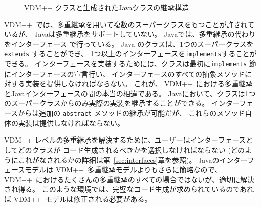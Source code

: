 \documentclass[\pformat,11pt]{jarticle}
\newcommand{\VDM}{VDM++}
\begin{document}
\begin{figure}[H]
\begin{center}
\quad
{}
\end{center}
\caption{VDM++ クラスと生成されたJavaクラスの継承構造}\label{fig:sortppjava}

\end{figure}

\VDM\ では、多重継承を用いて複数のスーパークラスをもつことが許されているが、
Javaは多重継承をサポートしていない。
Javaでは、多重継承の代わりをインターフェース \cite{Gosling&00}で行っている。
Java のクラスは、1つのスーパークラスを{\tt extends} することができ、
1つ以上のインターフェースを{\tt implements}することができる。
インターフェースを実装するためには、クラスは最初に{\tt implements} 節にインターフェースの宣言行い、
インターフェースのすべての抽象メソッドに対する実装を提供しなければならない。
これが、 \VDM\ における多重継承とJavaインターフェースの間の本当の相違である。
Javaにおいて、クラスは1つのスーパークラスからのみ実際の実装を継承することができる。
インターフェースからは追加の {\tt abstract} メソッドの継承が可能だが、
これらのメソッド自体の実装は提供しなければならない。

 VDM++ レベルの多重継承を解決するために、ユーザーはインターフェースとしてどのクラスが
コード生成されるべきかを選択しなければならない (どのようにこれがなされるかの詳細は第~\ref{sec:interfaces}章を参照)。
Javaのインターフェースモデルは \VDM\ 多重継承モデルよりもさらに簡略なので、
\VDM\ におけるたくさんの多重継承のすべての場合ではないが、適切に解決され得る。
このような環境では、完璧なコード生成が求められているのであれば \VDM\ モデルは修正される必要がある。 
\end{document}
